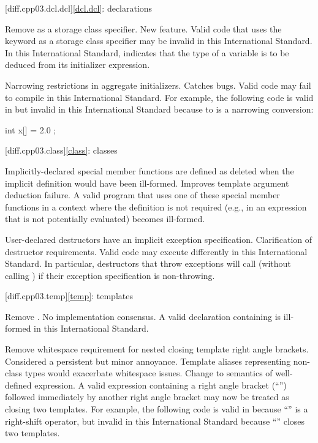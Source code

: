[diff.cpp03.dcl.dcl]{\ref{dcl.dcl}: declarations}

\change Remove  as a storage class specifier.
\rationale New feature.
\effect
Valid \CppIII{} code that uses the keyword  as a storage class
specifier may be invalid in this International Standard. In this International
Standard,  indicates that the type of a variable is to be deduced
from its initializer expression.

\change Narrowing restrictions in aggregate initializers.
\rationale Catches bugs.
\effect
Valid \CppIII{} code may fail to compile in this International Standard. For
example, the following code is valid in \CppIII{} but invalid in this
International Standard because  to  is a narrowing
conversion:

\begin{codeblock}
int x[] = { 2.0 };
\end{codeblock}

[diff.cpp03.class]{\ref{class}: classes}

\change Implicitly-declared special member functions are defined as deleted
when the implicit definition would have been ill-formed.
\rationale Improves template argument deduction failure.
\effect
A valid \CppIII{} program that uses one of these special member functions in a
context where the definition is not required (e.g., in an expression that is
not potentially evaluated) becomes ill-formed.

\change User-declared destructors have an implicit exception specification.
\rationale Clarification of destructor requirements.
\effect
Valid \CppIII{} code may execute differently in this International Standard. In
particular, destructors that throw exceptions will call 
(without calling ) if their exception specification is
non-throwing.

[diff.cpp03.temp]{\ref{temp}: templates}

\change Remove .
\rationale No implementation consensus.
\effect
A valid \CppIII{} declaration containing  is ill-formed in this
International Standard.

\change Remove whitespace requirement for nested closing template right angle
brackets.
\rationale Considered a persistent but minor annoyance. Template aliases
representing non-class types would exacerbate whitespace issues.
\effect
Change to semantics of well-defined expression. A valid \CppIII{} expression
containing a right angle bracket (``\tcode{>}'') followed immediately by
another right angle bracket may now be treated as closing two templates.
For example, the following code is valid in \CppIII{} because ``\tcode{>>}''
is a right-shift operator, but invalid in this International Standard because
``\tcode{>>}'' closes two templates.

